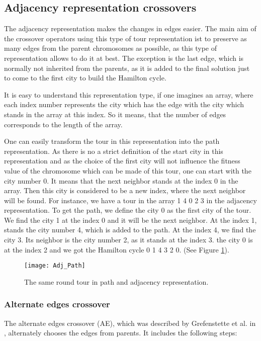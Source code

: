 \documentclass[a4paper, 12pt, headings=standardclasses]{scrartcl}
\begin{document}
\subsection{Adjacency representation crossovers}
The adjacency representation makes the changes in edges easier. The main aim of the crossover operators using this type of tour representation ist to preserve as many edges from the parent chromosomes as possible, as this type of representation allows to do it at best. The exception is the last edge, which is normally not inherited from the parents, as it is added to the final solution just to come to the first city to build the Hamilton cycle. \par

It is easy to understand this representation type, if one imagines an array, where each index number represents the city which has the edge with the city which stands in the array at this index. So it means, that the number of edges corresponds to the length of the array.\par

One can easily transform the tour in this representation into the path representation. As there is no a strict definition of the start city in this representation and as the choice of the first city will not influence the fitness value of the chromosome which can be made of this tour, one can start with the city number 0. It means that the next neighbor stands at the index 0 in the array. Then this city is considered to be a new index, where the next neighbor will be found. For instance, we have a tour in the array 1 4 0 2 3 in the adjacency representation. To get the path, we define the city 0 as the first city of the tour. We find the city 1 at the index 0 and it will be the next neighbor. At the index 1, stands the city number 4, which is added to the path. At the index 4, we find the city 3. Its neighbor is the city number 2, as it stands at the index 3. the city 0 is at the index 2 and we got the Hamilton cycle 0 1 4 3 2 0. (See Figure \ref{Adj_Path}).

\begin{figure}[!ht]
	\centering
	\texttt{[image: Adj\_Path]}
	\caption{The same round tour in path and adjacency representation. }
	\label{Adj_Path}
\end{figure}

\subsubsection{Alternate edges crossover}
The alternate edges crossover (AE), which was described by Grefenstette et al. in \cite{grefenstette1985genetic}, alternately chooses the edges from parents. It includes the following steps:
\end{document}

